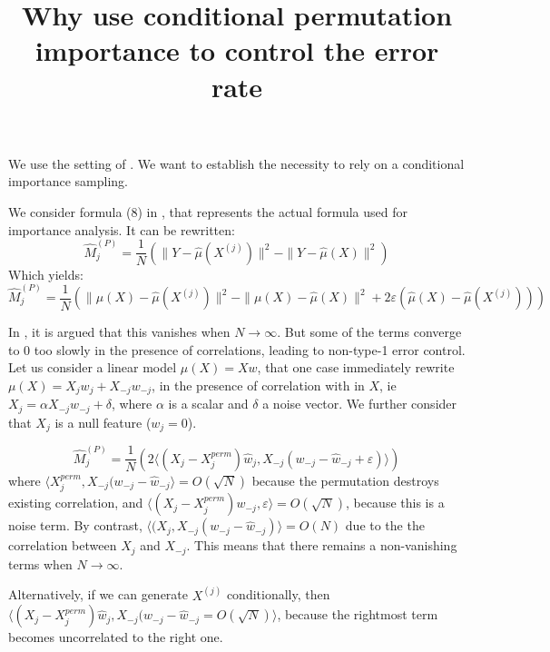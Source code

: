 \documentclass[12pt]{report}
\title{Why use conditional permutation importance to control the error rate}
\begin{document}
\maketitle

We use the setting of \cite{miPermutationbasedIdentificationImportant2021}.
%
We want to establish the necessity to rely on a conditional importance sampling.

We consider formula (8) in \cite{miPermutationbasedIdentificationImportant2021}, that represents the actual formula used for importance analysis.
%
It can be rewritten:
\[ \hat{M}_j^{(P)} = \frac{1}{N} \left( \| Y-\hat{\mu}(X^{(j)}) \|^2 - \| Y-\hat{\mu}(X) \|^2 \right)
\]
Which yields:
\[
\hat{M}_j^{(P)} = \frac{1}{N} \left( \| \mu(X)-\hat{\mu}(X^{(j)}) \|^2 - \| \mu(X)-\hat{\mu}(X)  \|^2 + 2 \varepsilon (\hat{\mu}(X)-\hat{\mu}(X^{(j)}))  \right)
\]

In \cite{miPermutationbasedIdentificationImportant2021}, it is argued that this vanishes when $N \rightarrow \infty$.
%
But some of the terms converge to 0 too slowly in the presence of correlations, leading to non-type-1 error control.
%
Let us consider a linear model $\mu(X) = Xw$, that one case immediately rewrite $\mu(X) = X_jw_j + X_{-j}w_{-j}$, in the presence of correlation with in $X$, ie $X_j = \alpha X_{-j} w_{-j} + \delta$, where $\alpha$ is a scalar and $\delta$ a noise vector.
%
We further consider that $X_j$ is a null feature ($w_j=0$).
%


\[
\hat{M}_j^{(P)} = \frac{1}{N} \left( 2  \langle (X_j - X_j^{perm}) \hat{w}_j, X_{-j} (w_{-j} - \hat{w}_{-j} + \varepsilon) \rangle \right)
\]
where
$\langle X_j^{perm}, X_{-j} (w_{-j} - \hat{w}_{-j} \rangle = O(\sqrt{N})$ because the permutation destroys existing correlation, and
$\langle (X_j - X_j^{perm}) w_{-j}, \varepsilon \rangle = O(\sqrt{N})$, because this is a noise term.
%
By contrast,
$\langle (X_j, X_{-j} (w_{-j} - \hat{w}_{-j}) \rangle = O(N)$ due to the the correlation between $X_j$ and $X_{-j}$.
This means that there remains a non-vanishing terms when $N \rightarrow \infty$.

Alternatively, if we can generate $X^{(j)}$ conditionally, then
$\langle (X_j - X_j^{perm}) \hat{w}_j, X_{-j} (w_{-j} - \hat{w}_{-j} = O(\sqrt{N}) \rangle$, because the rightmost term becomes uncorrelated to the right one.
\end{document}
